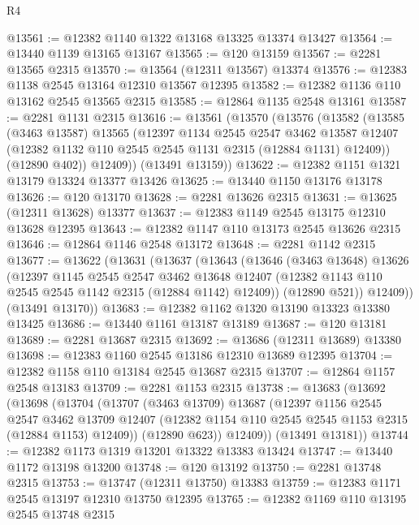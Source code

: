 \begin{lexlean}{R4}
\begin{coremodule}
@13561 := @12382 @1140 @1322 @13168 @13325 @13374 @13427
@13564 := @13440 @1139 @13165 @13167
@13565 := @120 @13159
@13567 := @2281 @13565 @2315
@13570 := @13564 (@12311 @13567) @13374
@13576 := @12383 @1138 @2545 @13164 @12310 @13567 @12395
@13582 := @12382 @1136 @110 @13162 @2545 @13565 @2315
@13585 := @12864 @1135 @2548 @13161
@13587 := @2281 @1131 @2315
@13616 := @13561
    (@13570
      (@13576
        (@13582
          (@13585
            (@3463 @13587)
            @13565
            (@12397
              @1134
              @2545
              @2547
              @3462
              @13587
              @12407
              (@12382 @1132 @110 @2545 @2545 @1131 @2315 (@12884 @1131) @12409))
            (@12890 @402))
          @12409))
      (@13491 @13159))
@13622 := @12382 @1151 @1321 @13179 @13324 @13377 @13426
@13625 := @13440 @1150 @13176 @13178
@13626 := @120 @13170
@13628 := @2281 @13626 @2315
@13631 := @13625 (@12311 @13628) @13377
@13637 := @12383 @1149 @2545 @13175 @12310 @13628 @12395
@13643 := @12382 @1147 @110 @13173 @2545 @13626 @2315
@13646 := @12864 @1146 @2548 @13172
@13648 := @2281 @1142 @2315
@13677 := @13622
    (@13631
      (@13637
        (@13643
          (@13646
            (@3463 @13648)
            @13626
            (@12397
              @1145
              @2545
              @2547
              @3462
              @13648
              @12407
              (@12382 @1143 @110 @2545 @2545 @1142 @2315 (@12884 @1142) @12409))
            (@12890 @521))
          @12409))
      (@13491 @13170))
@13683 := @12382 @1162 @1320 @13190 @13323 @13380 @13425
@13686 := @13440 @1161 @13187 @13189
@13687 := @120 @13181
@13689 := @2281 @13687 @2315
@13692 := @13686 (@12311 @13689) @13380
@13698 := @12383 @1160 @2545 @13186 @12310 @13689 @12395
@13704 := @12382 @1158 @110 @13184 @2545 @13687 @2315
@13707 := @12864 @1157 @2548 @13183
@13709 := @2281 @1153 @2315
@13738 := @13683
    (@13692
      (@13698
        (@13704
          (@13707
            (@3463 @13709)
            @13687
            (@12397
              @1156
              @2545
              @2547
              @3462
              @13709
              @12407
              (@12382 @1154 @110 @2545 @2545 @1153 @2315 (@12884 @1153) @12409))
            (@12890 @623))
          @12409))
      (@13491 @13181))
@13744 := @12382 @1173 @1319 @13201 @13322 @13383 @13424
@13747 := @13440 @1172 @13198 @13200
@13748 := @120 @13192
@13750 := @2281 @13748 @2315
@13753 := @13747 (@12311 @13750) @13383
@13759 := @12383 @1171 @2545 @13197 @12310 @13750 @12395
@13765 := @12382 @1169 @110 @13195 @2545 @13748 @2315

\end{coremodule}
\end{lexlean}

